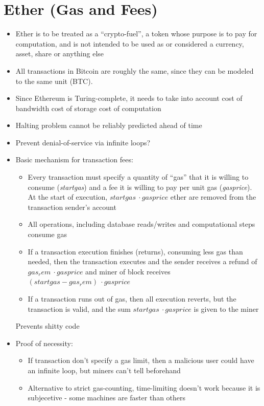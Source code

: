 \documentclass{article}
\begin{document}
\section*{Ether (Gas and Fees)}
\begin{itemize}
  \item Ether is to be treated as a ``crypto-fuel'', a token whose purpose is to pay for computation, and is not intended to be used as or considered
    a currency, asset, share or anything else
  \item All transactions in Bitcoin are roughly the same, since they can be modeled to the same unit (BTC).
  \item Since Ethereum is Turing-complete, it needs to take into account
    \subitem cost of bandwidth
    \subitem cost of storage
    \subitem cost of computation
  \item Halting problem cannot be reliably predicted ahead of time
  \item Prevent denial-of-service via infinite loops?
  \item Basic mechanism for transaction fees:
    \begin{itemize}
      \item Every transaction must specify a quantity of ``gas'' that it is willing to consume (\emph{startgas})
        and a fee it is willing to pay per unit gas (\emph{gasprice}). At the start of execution, 
        $startgas\ \cdot gasprice$ ether are removed from the transaction sender's account
      \item All operations, including database reads/writes and computational steps consume gas
      \item If a transaction execution finishes (returns), consuming less gas than needed, then the transaction executes
        and the sender receives a refund of $gas_rem\ \cdot gasprice$ and miner of block receives $(startgas - gas_rem)\ \cdot
        gasprice$
      \item If a transaction runs out of gas, then all execution reverts, but the transaction is valid, and the sum $startgas\ \cdot gasprice$
        is given to the miner
    \end{itemize}
    \subitem Prevents shitty code
  \item Proof of necessity:
    \begin{itemize}
      \item If transaction don't specify a gas limit, then a malicious user could have an infinite loop, but miners can't tell beforehand
      \item Alternative to strict gas-counting, time-limiting doesn't work because it is subjecetive - some machines are faster than others

\end{itemize}
\end{itemize}
\end{document}
